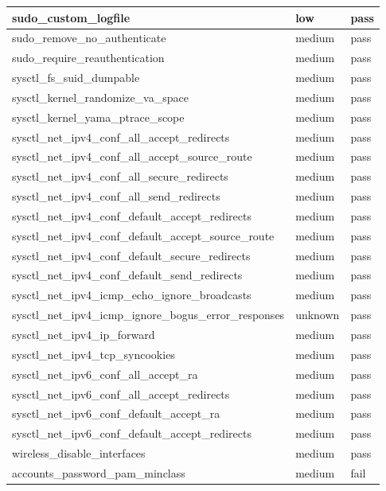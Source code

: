 \begin{longtable}{|p{10cm}|p{2cm}|p{2cm}|}
\hline
sudo\_custom\_logfile & low & pass \\
\hline
sudo\_remove\_no\_authenticate & medium & pass \\
\hline
sudo\_require\_reauthentication & medium & pass \\
\hline
sysctl\_fs\_suid\_dumpable & medium & pass \\
\hline
sysctl\_kernel\_randomize\_va\_space & medium & pass \\
\hline
sysctl\_kernel\_yama\_ptrace\_scope & medium & pass \\
\hline
sysctl\_net\_ipv4\_conf\_all\_accept\_redirects & medium & pass \\
\hline
sysctl\_net\_ipv4\_conf\_all\_accept\_source\_route & medium & pass \\
\hline
sysctl\_net\_ipv4\_conf\_all\_secure\_redirects & medium & pass \\
\hline
sysctl\_net\_ipv4\_conf\_all\_send\_redirects & medium & pass \\
\hline
sysctl\_net\_ipv4\_conf\_default\_accept\_redirects & medium & pass \\
\hline
sysctl\_net\_ipv4\_conf\_default\_accept\_source\_route & medium & pass \\
\hline
sysctl\_net\_ipv4\_conf\_default\_secure\_redirects & medium & pass \\
\hline
sysctl\_net\_ipv4\_conf\_default\_send\_redirects & medium & pass \\
\hline
sysctl\_net\_ipv4\_icmp\_echo\_ignore\_broadcasts & medium & pass \\
\hline
sysctl\_net\_ipv4\_icmp\_ignore\_bogus\_error\_responses & unknown & pass \\
\hline
sysctl\_net\_ipv4\_ip\_forward & medium & pass \\
\hline
sysctl\_net\_ipv4\_tcp\_syncookies & medium & pass \\
\hline
sysctl\_net\_ipv6\_conf\_all\_accept\_ra & medium & pass \\
\hline
sysctl\_net\_ipv6\_conf\_all\_accept\_redirects & medium & pass \\
\hline
sysctl\_net\_ipv6\_conf\_default\_accept\_ra & medium & pass \\
\hline
sysctl\_net\_ipv6\_conf\_default\_accept\_redirects & medium & pass \\
\hline
wireless\_disable\_interfaces & medium & pass \\
\hline
accounts\_password\_pam\_minclass & medium & fail \\
\hline

\end{longtable}
